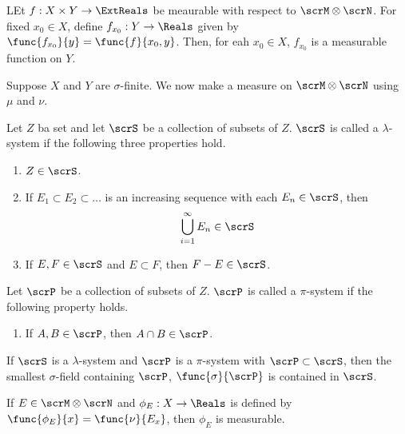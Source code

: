 \begin{corollary}
    LEt \(f: X \times Y \to \ExtReals\) be meaurable with respect to \(\scrM \otimes \scrN\). For fixed \(x_0 \in X\), define \(f_{x_0} : Y \to \Reals\) given by \(\func{f_{x_0}}{y} = \func{f}{x_0,y}\). Then, for eah \(x_0 \in X\), \(f_{x_0}\) is a measurable function on \(Y\).
\end{corollary}

Suppose \(X\) and \(Y\) are \(\sigma\)-finite. We now make a measure on \(\scrM \otimes \scrN\) using \(\mu\) and \(\nu\).

\begin{definition}
    Let \(Z\) ba set and let \(\scrS\) be a collection of subsets of \(Z\). \(\scrS\) is called a \(\lambda\)-system if the following three properties hold. 
    \begin{enumerate}[label = \(\lambda\)\arabic*.]
        \item \(Z \in \scrS\).
        \item If \(E_1 \subset E_2 \subset \dots\) is an increasing sequence with each \(E_n \in \scrS\), then 
        \begin{equation*}
            \bigcup_{i = 1}^{\infty} E_n \in \scrS
        \end{equation*}
        \item If \(E,F \in \scrS\) and \(E \subset F\), then \(F - E \in \scrS\).
    \end{enumerate}
\end{definition}

\begin{definition}
    Let \(\scrP\) be a collection of subsets of \(Z\). \(\scrP\) is called a \(\pi\)-system if the following  property holds. 
    \begin{enumerate}[label = \(\pi\)\arabic*.]

        \item If \(A,B \in \scrP\), then \(A \cap B \in \scrP\).
    \end{enumerate}
\end{definition}

\begin{theorem}
    If \(\scrS\) is a \(\lambda\)-system and \(\scrP\) is a \(\pi\)-system with \(\scrP \subset \scrS\), then the smallest \(\sigma\)-field containing \(\scrP\), \(\func{\sigma}{\scrP}\) is contained in \(\scrS\).
\end{theorem}

\begin{proposition}
    If \(E \in \scrM \otimes \scrN\) and \(\phi_E : X \to \Reals\) is defined by \(\func{\phi_E}{x} = \func{\nu}{E_x}\), then \(\phi_E\) is measurable.
\end{proposition}

